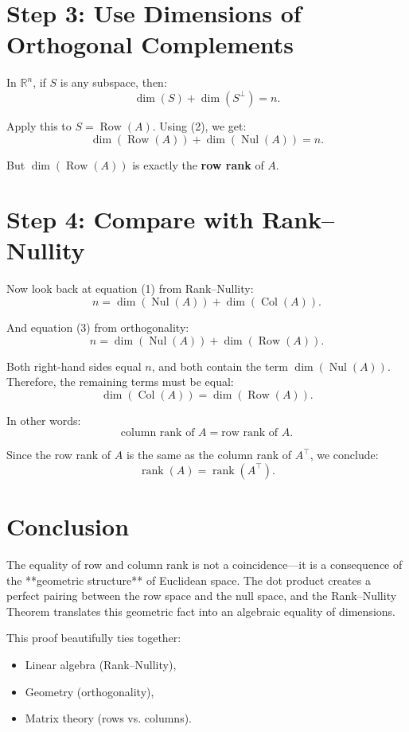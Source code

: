\documentclass[11pt]{article}
\begin{document}
\section*{Step 3: Use Dimensions of Orthogonal Complements}

In $ \mathbb{R}^n $, if $ S $ is any subspace, then:
\[
\dim(S) + \dim(S^\perp) = n.
\]

Apply this to $ S = \operatorname{Row}(A) $. Using (2), we get:
\[
\dim(\operatorname{Row}(A)) + \dim(\operatorname{Nul}(A)) = n.
\tag{3}
\]

But $ \dim(\operatorname{Row}(A)) $ is exactly the \textbf{row rank} of $ A $.

\section*{Step 4: Compare with Rank--Nullity}

Now look back at equation (1) from Rank--Nullity:
\[
n = \dim(\operatorname{Nul}(A)) + \dim(\operatorname{Col}(A)).
\]

And equation (3) from orthogonality:
\[
n = \dim(\operatorname{Nul}(A)) + \dim(\operatorname{Row}(A)).
\]

Both right-hand sides equal $ n $, and both contain the term $ \dim(\operatorname{Nul}(A)) $.  
Therefore, the remaining terms must be equal:
\[
\dim(\operatorname{Col}(A)) = \dim(\operatorname{Row}(A)).
\]

In other words:
\[
\text{column rank of } A = \text{row rank of } A.
\]

Since the row rank of $ A $ is the same as the column rank of $ A^\top $, we conclude:
\[
\operatorname{rank}(A) = \operatorname{rank}(A^\top).
\]

\section*{Conclusion}

The equality of row and column rank is not a coincidence—it is a consequence of the **geometric structure** of Euclidean space.  
The dot product creates a perfect pairing between the row space and the null space, and the Rank--Nullity Theorem translates this geometric fact into an algebraic equality of dimensions.

This proof beautifully ties together:
\begin{itemize}
\item Linear algebra (Rank--Nullity),
    \item Geometry (orthogonality),
    \item Matrix theory (rows vs. columns).
\end{itemize}
\end{document}
